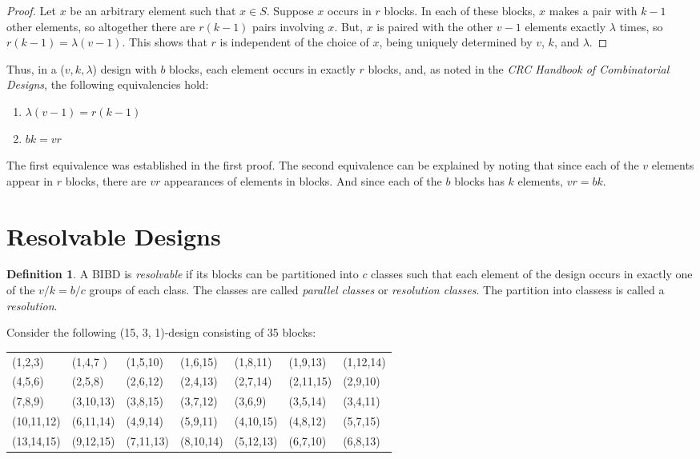 \documentclass[12pt]{article}
\theoremstyle{definition}
\newtheorem{mydef}{Definition}
\begin{document}
\begin{proof}\label{pf1}
Let $x$ be an arbitrary element such that $x \in S$. Suppose $x$ occurs in $r$ blocks. In each of these blocks, $x$ makes a pair with $k-1$ other elements, so altogether there are $r(k-1)$ pairs involving $x$. But, $x$ is paired with the other $v-1$ elements exactly $\lambda$ times, so $r(k-1) = \lambda(v-1)$. This shows that $r$ is independent of the choice of $x$, being uniquely determined by $v$, $k$, and $\lambda$. 
\end{proof}
Thus, in a ($v, k, \lambda$) design with $b$ blocks, each element occurs in exactly $r$ blocks, and, as noted in the \textit{CRC Handbook of Combinatorial Designs}\cite{Colbourn}, the following equivalencies hold:
\begin{center}
\begin{enumerate}
\item $\lambda(v-1) = r(k-1)$
\item $bk = vr$
\end{enumerate}
\end{center}

The first equivalence was established in the first proof. The second equivalence can be explained by noting that since each of the $v$ elements appear in $r$ blocks, there are $vr$ appearances of elements in blocks. And since each of the $b$ blocks has $k$ elements, $vr = bk$.

\section{Resolvable Designs}
\begin{mydef}
A BIBD is \textit{resolvable} if its blocks can be partitioned into $c$ classes such that each element of the design occurs in exactly one of the $v/k = b/c$ groups of each class. The classes are called \textit{parallel classes} or \textit{resolution classes}. The partition into classess is called a \textit{resolution}. \cite{Triska}
\end{mydef}
Consider the following (15, 3, 1)-design consisting of 35 blocks:
\begin{center}
\begin{tabular}{lllllll} 
(1,2,3) & (1,4,7 ) & (1,5,10) & (1,6,15) & (1,8,11) &  (1,9,13) & (1,12,14) \\
(4,5,6) & (2,5,8) & (2,6,12) & (2,4,13) &  (2,7,14) & (2,11,15) & (2,9,10) \\
(7,8,9) & (3,10,13) & (3,8,15) & (3,7,12) &  (3,6,9) & (3,5,14) & (3,4,11) \\
(10,11,12) & (6,11,14) & (4,9,14) & (5,9,11) &  (4,10,15) & (4,8,12) & (5,7,15) \\
(13,14,15) & (9,12,15) & (7,11,13) & (8,10,14) &  (5,12,13) & (6,7,10) & (6,8,13)
\end{tabular}
\end{center}
\end{document}
